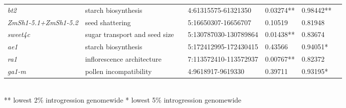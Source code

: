 \begin{sidewaystable}[ht]
\begin{tabular}{lllllll}
\textit{bt2} & starch biosynthesis & \cite{Whitt:2002_starch} & 4:61315575-61321350 & 0.03274** & 0.98442**  \\ 

\textit{ZmSh1-5.1+ZmSh1-5.2} & seed shattering & \cite{Lin:2012_shattering} & 5:16650307-16656707 & 0.10519 & 0.81948 \\ 

\textit{sweet4c} & sugar transport and seed size & \cite{Sosso:2015} & 5:130787030-130789864 & 0.01438** & 0.83674 \\ 

\textit{ae1} & starch biosynthesis & \cite{Whitt:2002_starch} & 5:172412995-172430415 & 0.43566 & 0.94051*\\ 

\textit{ra1} & inflorescence architecture & \cite{Vollbrecht:2005_ramosa, Sigmon_Vollbrecht:2010} & 7:113572410-113572937 & 0.00767** & 0.82372 \\ 

\textit{ga1-m} & pollen incompatibility & \cite{Lu:2020_incompatibility} & 4:9618917-9619330 & 0.39711 & 0.93195* \\ 
   \hline
\end{tabular}
\\
** lowest 2\% introgression genomewide \hspace{1cm} * lowest 5\% introgression genomewide
\end{sidewaystable}
